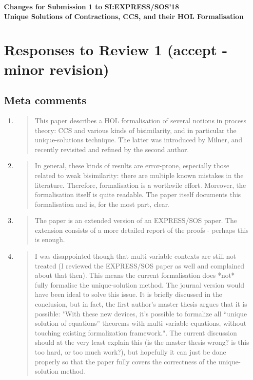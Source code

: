 \begin{center}
\textbf{
{\small Changes for Submission 1 to SI:EXPRESS/SOS'18}\\[5mm]
{\large Unique Solutions of Contractions, CCS, and their HOL
  Formalisation
}}
\end{center}

\section*{Responses to Review 1 (accept - minor revision)}

\subsection*{Meta comments}

\begin{enumerate}
\item \begin{quote}
    This paper describes a HOL formalisation of several notions in
    process theory: CCS and various kinds of bisimilarity, and in
    particular the unique-solutions technique. The latter was
    introduced by Milner, and recently revisited and refined by the
    second author.
  \end{quote}
  
\item \begin{quote}
    In general, these kinds of results are error-prone, especially
    those related to weak bisimilarity: there are multiple known
    mistakes in the literature. Therefore, formalisation is a
    worthwile effort. Moreover, the formalisation itself is quite
    readable. The paper itself documents this formalisation and is,
    for the most part, clear.
  \end{quote}

\item \begin{quote}
    The paper is an extended version of an EXPRESS/SOS paper. The
    extension consists of a more detailed report of the proofs -
    perhaps this is enough.
  \end{quote}

\item \begin{quote}
    I was disappointed though that multi-variable contexts are still
    not treated (I reviewed the EXPRESS/SOS paper as well and
    complained about that then). This means the current formalisation
    does *not* fully formalise the unique-solution method. The journal
    version would have been ideal to solve this issue. It is briefly
    discussed in the conclusion, but in fact, the first author's
    master thesis argues that it is possible: "With these new devices,
    it’s possible to formalize all “unique solution of equations”
    theorems with multi-variable equations, without touching existing
    formalization framework.". The current discussion should at the
    very least explain this (is the master thesis wrong? is this too
    hard, or too much work?), but hopefully it can just be done
    properly so that the paper fully covers the correctness of the
    unique-solution method. 
  \end{quote}


\end{enumerate}
